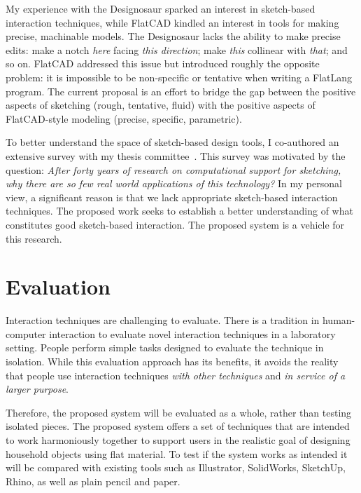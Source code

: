 \documentclass[11pt]{article}
\begin{document}
My experience with the Designosaur sparked an interest in sketch-based
interaction techniques, while FlatCAD kindled an interest in tools for
making precise, machinable models. The Designosaur lacks the ability
to make precise edits: make a notch \textit{here} facing \textit{this
  direction}; make \textit{this} collinear with \textit{that}; and so
on. FlatCAD addressed this issue but introduced roughly the opposite
problem: it is impossible to be non-specific or tentative when writing
a FlatLang program. The current proposal is an effort to bridge the
gap between the positive aspects of sketching (rough, tentative,
fluid) with the positive aspects of FlatCAD-style modeling (precise,
specific, parametric).

To better understand the space of sketch-based design tools, I
co-authored an extensive survey with my thesis
committee~\cite{johnson-sketch-review}. This survey was motivated by
the question: \textit{After forty years of research on computational
  support for sketching, why there are so few real world applications
  of this technology?} In my personal view, a significant reason is
that we lack appropriate sketch-based interaction techniques. The
proposed work seeks to establish a better understanding of what
constitutes good sketch-based interaction. The proposed system is a
vehicle for this research.



\section{Evaluation}

Interaction techniques are challenging to evaluate. There is a
tradition in human-computer interaction to evaluate novel interaction
techniques in a laboratory setting. People perform simple tasks
designed to evaluate the technique in isolation. While this evaluation
approach has its benefits, it avoids the reality that people use
interaction techniques \textit{with other techniques} and \textit{in
  service of a larger purpose}. 

Therefore, the proposed system will be evaluated as a whole, rather
than testing isolated pieces. The proposed system offers a set of
techniques that are intended to work harmoniously together to support
users in the realistic goal of designing household objects using flat
material. To test if the system works as intended it will be compared
with existing tools such as Illustrator, SolidWorks, SketchUp, Rhino,
as well as plain pencil and paper.
\end{document}
